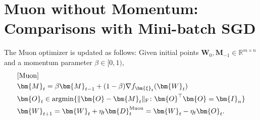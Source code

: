 \documentclass[twoside,11pt]{article}
\newcommand{\argmin}{\operatornamewithlimits{argmin}}
\begin{document}
\section{Muon without Momentum: Comparisons with Mini-batch SGD}
\label{sec:4}
The Muon optimizer \citep{jordan2024muon} is updated as follows: Given initial points $\bm{W}_0, \bm{M}_{-1} \in \mathbb{R}^{m \times n}$ and a momentum parameter $\beta \in [0,1)$, 
\begin{align}\label{Muon}
\begin{split}
&\text{[Muon]}\\
&\bm{M}_t = \beta \bm{M}_{t-1} + (1 - \beta) \nabla f_{\bm{\xi}_t} (\bm{W}_t)\\
&\bm{O}_t \in \argmin \{ \| \bm{O} - \bm{M}_t \|_{\mathrm{F}} \colon \bm{O}^\top \bm{O} = \bm{I}_n  \} \\
&\bm{W}_{t+1} 
= \bm{W}_t + \eta_t \bm{D}_t^{\mathrm{Muon}}
= \bm{W}_t - \eta_t \bm{O}_t.
\end{split}
\end{align}
\end{document}
